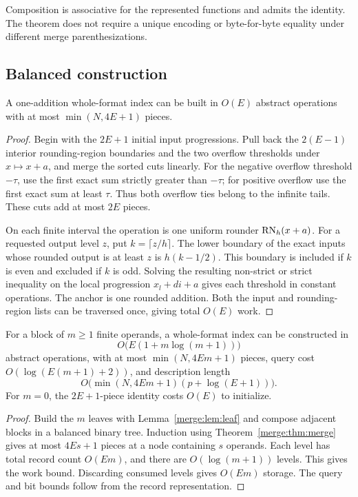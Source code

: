 \begin{remark}
Composition is associative for the represented functions and admits
the identity. The theorem does not require a unique encoding or
byte-for-byte equality under different merge parenthesizations.
\end{remark}

\subsection{Balanced construction}

\begin{lemma}\label{merge:lem:leaf}
A one-addition whole-format index can be built in $O(E)$ abstract
operations with at most $\min(N,4E+1)$ pieces.
\end{lemma}

\begin{proof}
Begin with the $2E+1$ initial input progressions. Pull back the
$2(E-1)$ interior rounding-region boundaries and the two overflow
thresholds under $x\mapsto x+a$, and merge the sorted cuts linearly.
For the negative overflow threshold $-\tau$, use the first exact sum
strictly greater than $-\tau$; for positive overflow use the first
exact sum at least $\tau$. Thus both overflow ties belong to the
infinite tails. These cuts add at most $2E$ pieces.

On each finite interval the operation is one uniform rounder
$\operatorname{RN}_h(x+a)$. For a requested output level $z$, put $k=\lceil z/h\rceil$.
The lower boundary of the exact inputs whose rounded output is at least
$z$ is $h(k-1/2)$. This boundary is included if $k$ is even and excluded
if $k$ is odd.
Solving the resulting non-strict or strict inequality on the local
progression $x_l+di+a$ gives each threshold in constant operations.
The anchor is one rounded addition. Both the input and rounding-region
lists can be traversed once, giving total $O(E)$ work.
\end{proof}

\begin{corollary}\label{merge:cor:balanced}
For a block of $m\geq1$ finite operands, a whole-format index can be
constructed in
\[
 O\bigl(E(1+m\log(m+1))\bigr)
\]
abstract operations, with at most $\min(N,4Em+1)$ pieces, query cost
$O(\log(E(m+1)+2))$, and description length
\[
 O\bigl(\min(N,4Em+1)(p+\log(E+1))\bigr).
\]
For $m=0$, the $2E+1$-piece identity costs $O(E)$ to initialize.
\end{corollary}

\begin{proof}
Build the $m$ leaves with Lemma~\ref{merge:lem:leaf} and compose adjacent
blocks in a balanced binary tree. Induction using
Theorem~\ref{merge:thm:merge} gives at most $4Es+1$ pieces at a node
containing $s$ operands. Each level has total record count $O(Em)$,
and there are $O(\log(m+1))$ levels. This gives the work bound.
Discarding consumed levels gives $O(Em)$ storage. The query and bit
bounds follow from the record representation.
\end{proof}

